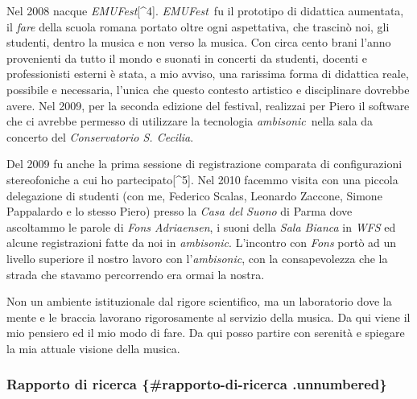\documentclass[a4paper,11pt]{article}
\begin{document}
Nel 2008 nacque \emph{EMUFest}{[}\^{}4{]}. \emph{EMUFest} fu il prototipo di didattica
aumentata, il \emph{fare} della scuola romana portato oltre ogni aspettativa,
che trascinò noi, gli studenti, dentro la musica e non verso la musica.
Con circa cento brani l'anno provenienti da tutto il mondo e suonati in
concerti da studenti, docenti e professionisti esterni è stata, a mio
avviso, una rarissima forma di didattica reale, possibile e necessaria,
l'unica che questo contesto artistico e disciplinare dovrebbe avere. Nel
2009, per la seconda edizione del festival, realizzai per Piero il
software che ci avrebbe permesso di utilizzare la tecnologia
\emph{ambisonic} nella sala da concerto del \emph{Conservatorio S. Cecilia}.

Del 2009 fu anche la prima sessione di registrazione comparata di
configurazioni stereofoniche a cui ho partecipato{[}\^{}5{]}. Nel 2010 facemmo
visita con una piccola delegazione di studenti (con me, Federico Scalas,
Leonardo Zaccone, Simone Pappalardo e lo stesso Piero) presso la \emph{Casa
del Suono} di Parma dove ascoltammo le parole di \emph{Fons Adriaensen}, i
suoni della \emph{Sala Bianca} in \emph{WFS} ed alcune registrazioni fatte da noi
in \emph{ambisonic}. L'incontro con \emph{Fons} portò ad un livello superiore il
nostro lavoro con l'\emph{ambisonic}, con la consapevolezza che la strada che
stavamo percorrendo era ormai la nostra.

Non un ambiente istituzionale dal rigore scientifico, ma un laboratorio
dove la mente e le braccia lavorano rigorosamente al servizio della
musica. Da qui viene il mio pensiero ed il mio modo di fare. Da qui
posso partire con serenità e spiegare la mia attuale visione della
musica.



\subsubsection{Rapporto di ricerca \{\#rapporto-di-ricerca .unnumbered\}}\hypertarget{rapporto-di-ricerca-rapporto-di-ricerca-unnumbered}{}\label{rapporto-di-ricerca-rapporto-di-ricerca-unnumbered}
\end{document}
